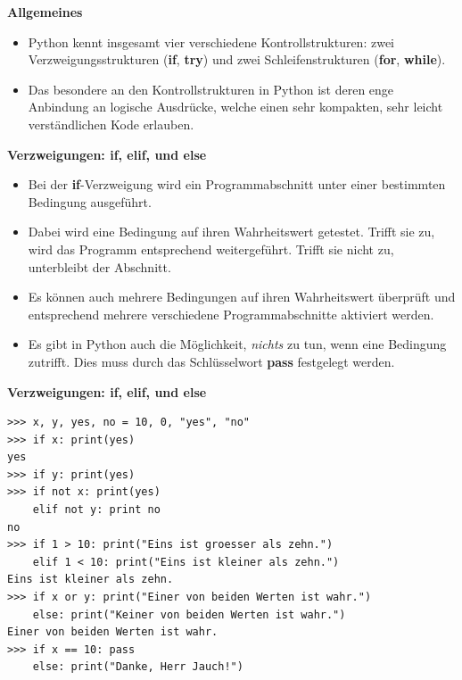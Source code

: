 \vspace{0.5cm}\par\noindent\textbf{Allgemeines}\vspace{0.5cm}

\begin{itemize}
\itemsep1pt\parskip0pt
\item
  {Python kennt insgesamt vier verschiedene Kontrollstrukturen: zwei
  Verzweigungsstrukturen (\textbf{if}, \textbf{try}) und zwei
  Schleifenstrukturen (\textbf{for}, \textbf{while}).}
\item
  {Das besondere an den Kontrollstrukturen in Python ist deren enge
  Anbindung an logische Ausdrücke, welche einen sehr kompakten, sehr
  leicht verständlichen Kode erlauben.}
\end{itemize}


\vspace{0.5cm}\par\noindent\textbf{Verzweigungen: if, elif, und else}\vspace{0.5cm}

\begin{itemize}
\itemsep1pt\parskip0pt
\item
  {Bei der \textbf{if}-Verzweigung wird ein Programmabschnitt unter
  einer bestimmten Bedingung ausgeführt.}
\item
  {Dabei wird eine Bedingung auf ihren Wahrheitswert getestet. Trifft
  sie zu, wird das Programm entsprechend weitergeführt. Trifft sie nicht
  zu, unterbleibt der Abschnitt.}
\item
  {Es können auch mehrere Bedingungen auf ihren Wahrheitswert überprüft
  und entsprechend mehrere verschiedene Programmabschnitte aktiviert
  werden.}
\item
  {Es gibt in Python auch die Möglichkeit, \emph{nichts} zu tun, wenn
  eine Bedingung zutrifft. Dies muss durch das Schlüsselwort
  \textbf{pass} festgelegt werden.}
\end{itemize}



\vspace{0.5cm}\par\noindent\textbf{Verzweigungen: if, elif, und else}\vspace{0.5cm}

\begin{verbatim}
>>> x, y, yes, no = 10, 0, "yes", "no"
>>> if x: print(yes)
yes
>>> if y: print(yes)
>>> if not x: print(yes)
    elif not y: print no
no
>>> if 1 > 10: print("Eins ist groesser als zehn.")
    elif 1 < 10: print("Eins ist kleiner als zehn.")
Eins ist kleiner als zehn.
>>> if x or y: print("Einer von beiden Werten ist wahr.")
    else: print("Keiner von beiden Werten ist wahr.")
Einer von beiden Werten ist wahr.
>>> if x == 10: pass
    else: print("Danke, Herr Jauch!")
\end{verbatim}


